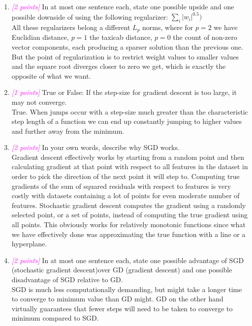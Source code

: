 \documentclass{article}
\newcommand{\1}{\mathbf{1}}
\newcommand{\points}[1]{\small\textcolor{magenta}{\emph{[#1 points]}} \normalsize}
\begin{document}
\begin{enumerate}
    \item \points{2} In at most one sentence each, state one possible upside and one possible downside of using the following regularizer: $\sum_i|w_i|^{0.5})$ \\
    All these regularizers belong a different $L_p$ norms, where for $p=2$ we have Euclidian distance, $p=1$ the taxicab distance, $p=0$ the count of non-zero vector components, each producing a sparser solution than the previous one. \\
    But the point of regularization is to restrict weight values to smaller values and the square root diverges closer to zero we get, which is exactly the opposite of what we want.
        
    \item \points{1} True or False:  If the step-size for gradient descent is too large, it may not converge. \\
    True. When jumps occur with a step-size much greater than the characteristic step length of a function we can end up constantly jumping to higher values and further away from the minimum.
    
    \item \points{2} In your own words, describe why SGD works. \\
    Gradient descent effectively works by starting from a random point and then calculating gradient at that point with respect to all features in the dataset in order to pick the direction of the next point it will step to. Computing true gradients of the sum of squared residuals with respect to features is very costly with datasets containing a lot of points for even moderate number of features. Stochastic gradient descent computes the gradient using a randomly selected point, or a set of points, instead of computing the true gradient using all points. This obviously works for relatively monotonic functions since what we have effectively done was approximating the true function with a line or a hyperplane.
    
    \item \points{2}In at most one sentence each, state one possible advantage of SGD (stochastic gradient descent)over GD (gradient descent) and one possible disadvantage of SGD relative to GD. \\
    SGD is much less computationally demanding, but might take a longer time to converge to minimum value than GD might. GD on the other hand virtually guarantees that fewer steps will need to be taken to converge to minimum compared to SGD.
    \end{enumerate}
\end{document}

